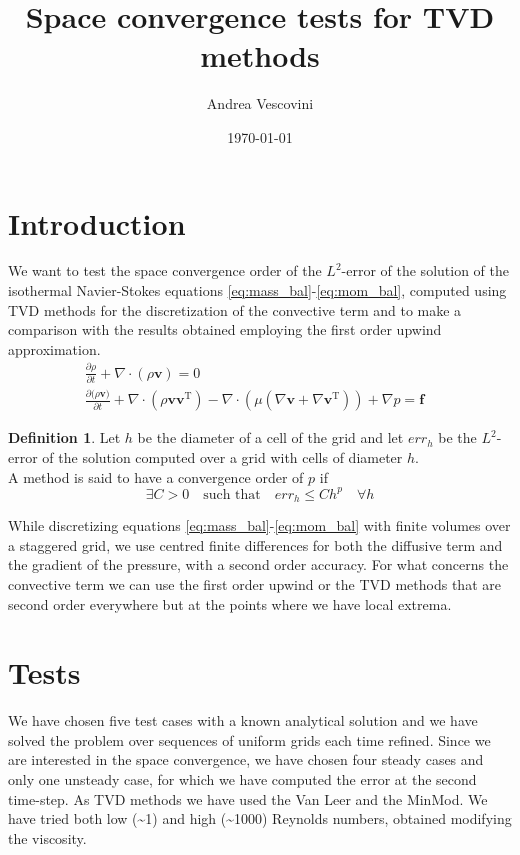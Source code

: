 \documentclass[11pt, a4paper]{article}
\title{\textbf{Space convergence tests for TVD methods}}
\author{Andrea Vescovini}
\date{\today}
\theoremstyle{definition}
\newtheorem{defn}{Definition}
\begin{document}
	\maketitle

\section{Introduction}
We want to test the space convergence order of the $L^2$-error of the solution 
of the 
isothermal Navier-Stokes equations \eqref{eq:mass_bal}-\eqref{eq:mom_bal}, 
computed using TVD methods for the discretization of the convective term and to 
make a comparison with the results obtained employing the first order upwind 
approximation.
\begin{align}
\label{eq:mass_bal} \frac{\partial\rho}{\partial t} + \nabla \cdot (\rho 
\mathbf{v}) = 0&\\
\label{eq:mom_bal} \frac{\partial{(\rho \mathbf{v}})}{\partial t} + \nabla 
\cdot (\rho \mathbf{v} \mathbf{v^\mathrm{T}}) - \nabla \cdot (\mu (\nabla 
\mathbf{v} + \nabla \mathbf{v}^\mathrm{T})) + 
\nabla p = \mathbf{f}&
\end{align}

\begin{defn}
Let $h$ be the diameter of a cell of the grid and let $err_h$ be the 
$L^2$-error of the solution computed over a grid with cells of diameter $h$.\\
A method is said to have a convergence order of $p$ if
\begin{equation*}
\exists C > 0 \quad \text{such that} \quad err_h \leq C h^p \quad \forall h
\end{equation*}
\end{defn}

While discretizing equations \eqref{eq:mass_bal}-\eqref{eq:mom_bal} with finite 
volumes over a staggered grid, we use centred finite differences for both the 
diffusive term and the gradient of the pressure, with a second order accuracy.
For what concerns the convective term we can use the first order upwind or the 
TVD methods that are second order everywhere but at the points where we have 
local extrema.


\section{Tests}
We have chosen five test cases with a known analytical solution and we have 
solved the problem over sequences of uniform grids each time refined. Since we 
are interested in the space convergence, we have chosen four steady cases and 
only one unsteady case, for which we have computed the error at the second 
time-step. 
As TVD methods we have used the Van Leer and the MinMod. We have tried both 
low (\textasciitilde 1) and high (\textasciitilde 1000) Reynolds numbers, 
obtained modifying the viscosity.
\end{document}
